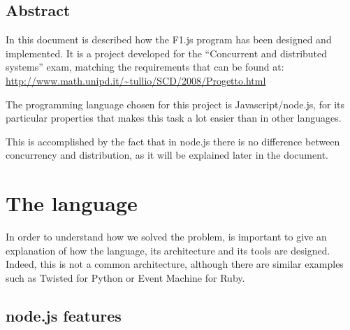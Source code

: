 
\def\PROJECT			{F1.js} %
\def\AUTHOR			{\ME}
\def\REPOurl		{https://github.com/filnik/F1.js}

\def\TABLES		{false} %
\def\FIGURES	{true} %



\newpage


\newpage

\begin{center}
\section*{Abstract}
\end{center}
In this document is described how the F1.js program has been designed and implemented. It is a project developed for the ``Concurrent and distributed systems'' exam, matching the requirements that can be found at: \url{http://www.math.unipd.it/~tullio/SCD/2008/Progetto.html}

The programming language chosen for this project is Javascript/node.js, for its particular properties that makes this task a lot easier than in other languages.

This is accomplished by the fact that in node.js there is no difference between concurrency and distribution, as it will be explained later in the document.

\newpage
\section{The language}
In order to understand how we solved the problem, is important to give an explanation of how the language, its architecture and its tools are designed. Indeed, this is not a common architecture, although there are similar examples such as Twisted for Python or Event Machine for Ruby.

\subsection{node.js features}

